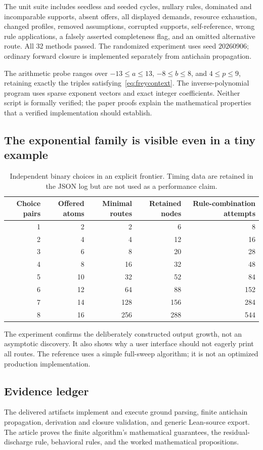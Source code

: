 \documentclass[11pt,a4paper]{article}
\theoremstyle{definition}\newtheorem{definition}[theorem]{Definition}
\theoremstyle{remark}\newtheorem{remark}[theorem]{Remark}
\begin{document}
The unit suite includes seedless and seeded cycles, nullary rules, dominated and incomparable supports, absent offers, all displayed demands, resource exhaustion, changed profiles, removed assumptions, corrupted supports, self-reference, wrong rule applications, a falsely asserted completeness flag, and an omitted alternative route. All 32 methods passed. The randomized experiment uses seed $20260906$; ordinary forward closure is implemented separately from antichain propagation.

The arithmetic probe ranges over $-13\le a\le13$, $-8\le b\le8$, and $4\le p\le9$, retaining exactly the triples satisfying~\eqref{eq:freycontext}. The inverse-polynomial program uses sparse exponent vectors and exact integer coefficients. Neither script is formally verified; the paper proofs explain the mathematical properties that a verified implementation should establish.

\subsection{The exponential family is visible even in a tiny example}
\begin{table}[htbp]\small
\caption{Independent binary choices in an explicit frontier. Timing data are retained in the JSON log but are not used as a performance claim.}
\begin{tabular}{@{}rrrrr@{}}\toprule
Choice pairs & Offered atoms & Minimal routes & Retained nodes & Rule-combination attempts\\\midrule
1&2&2&6&8\\
2&4&4&12&16\\
3&6&8&20&28\\
4&8&16&32&48\\
5&10&32&52&84\\
6&12&64&88&152\\
7&14&128&156&284\\
8&16&256&288&544\\\bottomrule
\end{tabular}
\end{table}
The experiment confirms the deliberately constructed output growth, not an asymptotic discovery. It also shows why a user interface should not eagerly print all routes. The reference uses a simple full-sweep algorithm; it is not an optimized production implementation.

\subsection{Evidence ledger}
The delivered artifacts implement and execute ground parsing, finite antichain propagation, derivation and closure validation, and generic Lean-source export. The article proves the finite algorithm's mathematical guarantees, the residual-discharge rule, behavioral rules, and the worked mathematical propositions.
\end{document}
